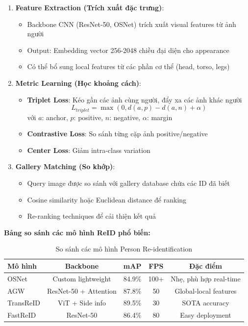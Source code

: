 \begin{enumerate}
    \item \textbf{Feature Extraction (Trích xuất đặc trưng)}:
    \begin{itemize}
        \item Backbone CNN (ResNet-50, OSNet) trích xuất visual features từ ảnh người
        \item Output: Embedding vector 256-2048 chiều đại diện cho appearance
        \item Có thể bổ sung local features từ các phần cơ thể (head, torso, legs)
    \end{itemize}
    
    \item \textbf{Metric Learning (Học khoảng cách)}:
    \begin{itemize}
        \item \textbf{Triplet Loss}: Kéo gần các ảnh cùng người, đẩy xa các ảnh khác người
        \begin{equation}
        L_{triplet} = \max(0, d(a, p) - d(a, n) + \alpha)
        \end{equation}
        với $a$: anchor, $p$: positive, $n$: negative, $\alpha$: margin
        \item \textbf{Contrastive Loss}: So sánh từng cặp ảnh positive/negative
        \item \textbf{Center Loss}: Giảm intra-class variation
    \end{itemize}
    
    \item \textbf{Gallery Matching (So khớp)}:
    \begin{itemize}
        \item Query image được so sánh với gallery database chứa các ID đã biết
        \item Cosine similarity hoặc Euclidean distance để ranking
        \item Re-ranking techniques để cải thiện kết quả
    \end{itemize}
\end{enumerate}

\textbf{Bảng so sánh các mô hình ReID phổ biến:}

\begin{table}[h!]
\centering
\caption{So sánh các mô hình Person Re-identification}
\small
\begin{tabular}{|l|c|c|c|c|}
\hline
\textbf{Mô hình} & \textbf{Backbone} & \textbf{mAP} & \textbf{FPS} & \textbf{Đặc điểm} \\
\hline
OSNet & Custom lightweight & 84.9\% & 100+ & Nhẹ, phù hợp real-time \\
\hline
AGW & ResNet-50 + Attention & 87.8\% & 50 & Global-local features \\
\hline
TransReID & ViT + Side info & 89.5\% & 30 & SOTA accuracy \\
\hline
FastReID & ResNet-50 & 86.4\% & 80 & Easy deployment \\
\hline
\end{tabular}
\label{tab:reid_comparison}
\end{table}

